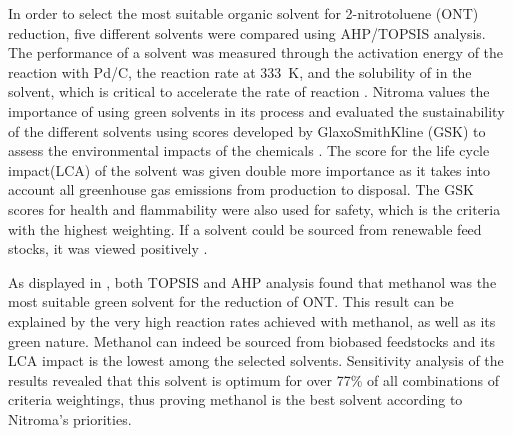 In order to select the most suitable organic solvent for 2-nitrotoluene (ONT) reduction, five different solvents were compared using AHP/TOPSIS analysis. The performance of a solvent was measured through the activation energy of the reaction with Pd/C, the reaction rate at \SI{333}{\K}, and the solubility of  in the solvent, which is critical to accelerate the rate of reaction \cite{rajadhyaksha_solvent_1986}. Nitroma values the importance of using green solvents in its process and evaluated the sustainability of the different solvents using scores developed by GlaxoSmithKline (GSK) to assess the environmental impacts of the chemicals \cite{henderson_expanding_2011}. The score for the life cycle impact(LCA) of the solvent was given double more importance as it takes into account all greenhouse gas emissions from production to disposal. The GSK scores for health and flammability were also used for safety, which is the criteria with the highest weighting. If a solvent could be sourced from renewable feed stocks, it was viewed positively \cite{byrne_tools_2016}. %

As displayed in , both TOPSIS and AHP analysis found that methanol was the most suitable green solvent for the reduction of ONT. This result can be explained by the very high reaction rates achieved with methanol, as well as its green nature. Methanol can indeed be sourced from biobased feedstocks and its LCA impact is the lowest among the selected solvents. Sensitivity analysis of the results revealed that this solvent is optimum for over 77\% of all combinations of criteria weightings, thus proving methanol is the best solvent according to Nitroma's priorities. 



